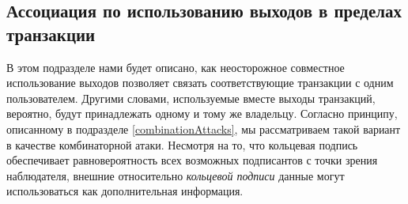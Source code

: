 \documentclass{mrl}
\begin{document}
\begin{comment}
attempt to mitigate the age-related effects on untraceability by recommending to wallet designers usage of an age-dependent selection of transaction outputs in ring signature generation in Section \ref{selection}. The selection of transaction outputs is a non-consensus practice for fashioning ring signatures, and so no protocol recommendation is being made.

Current wallet programs usually choose uniformly from the transaction output set. We recommend that wallets choose based on age such that the probability that a transaction is chosen for a ring signature is inversely proportional to the probability that it has already been spent. This way, transactions that are unlikely to have been spent are most likely to be chosen for ring signatures.

Recall we previously mentioned that, within a CryptoNote protocol like Monero, it is not easy to determine wither a transaction has been spent. Hence, estimating the probability distribution of lifespans is also not easy. A wallet designer can always feel free to make assumptions, though. By assuming that the marginal lifespan of a given transaction output is drawn from an exponential distribution, developing a non-uniform distribution is simple by inverting the cumulative distribution function. However, the exponential distribution is both memoryless and has a ``skinny-tail,'' whereas financial transactions are usually not memoryless and usually ``fat-tailed.'' Other distributions used in lifetime and income modeling, such as the Weibull distribution, the Pareto distribution, or the Burr distribution, may make more sense given the context of the problem. We discuss these issues in some detail in Section \ref{selection}.
\end{comment}

\subsection{Ассоциация по использованию выходов в пределах транзакции}\label{associationByUse}

В этом подразделе нами будет описано, как неосторожное совместное использование выходов позволяет связать соответствующие транзакции с одним пользователем. Другими словами, используемые вместе выходы транзакций, вероятно, будут принадлежать одному и тому же владельцу. Согласно принципу, описанному в подразделе \ref{combinationAttacks}, мы рассматриваем такой вариант в качестве комбинаторной атаки. Несмотря на то, что кольцевая подпись обеспечивает равновероятность всех возможных подписантов с точки зрения наблюдателя, внешние относительно \textit{кольцевой подписи} данные могут использоваться как дополнительная информация.
\end{document}
